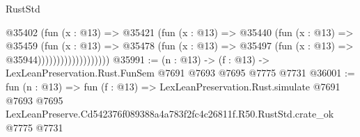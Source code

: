 \begin{lexlean}{RustStd}
\begin{coremodule}
                            @35402
                              (fun (x : @13) =>
                              @35421
                                (fun (x : @13) =>
                                @35440
                                  (fun (x : @13) =>
                                  @35459
                                    (fun (x : @13) =>
                                    @35478
                                      (fun (x : @13) =>
                                      @35497 (fun (x : @13) => @35944)))))))))))))))))))
@35991 := (n : @13) -> (f : @13) -> LexLeanPreservation.Rust.FunSem @7691 @7693 @7695 @7775 @7731
@36001 := fun (n : @13) =>
  fun (f : @13) =>
  LexLeanPreservation.Rust.simulate
    @7691
    @7693
    @7695
    LexLeanPreserve.Cd542376f089388a4a783f2fc4c26811f.R50.RustStd.crate_ok
    @7775
    @7731
\end{coremodule}
\end{lexlean}
